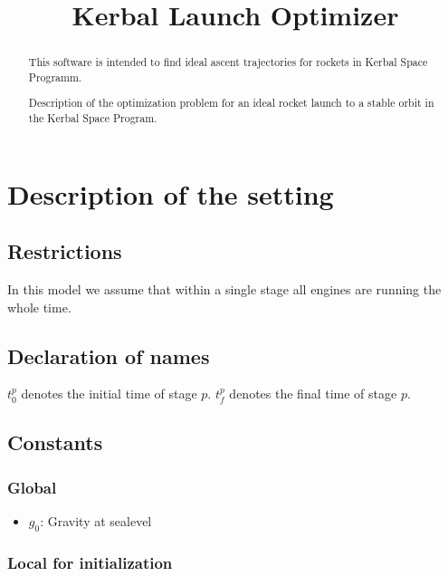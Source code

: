 \documentclass[11pt]{report}
\begin{document}
\title{Kerbal Launch Optimizer}

\maketitle

\begin{abstract}

  This software is intended to find ideal ascent trajectories for
  rockets in Kerbal Space Programm.

  Description of the optimization problem for an ideal rocket launch
  to a stable orbit in the Kerbal Space Program.

\end{abstract}

\tableofcontents

\chapter{Description of the setting}

\section{Restrictions}

In this model we assume that within a single stage all engines are
running the whole time.

\section{Declaration of names}

$t_0^p$ denotes the initial time of stage $p$.
$t_f^p$ denotes the final time of stage $p$.

\section{Constants}

\subsection{Global}

\begin{itemize}
\item $g_0$: Gravity at sealevel
\end{itemize}

\subsection{Local for initialization}
\end{document}
